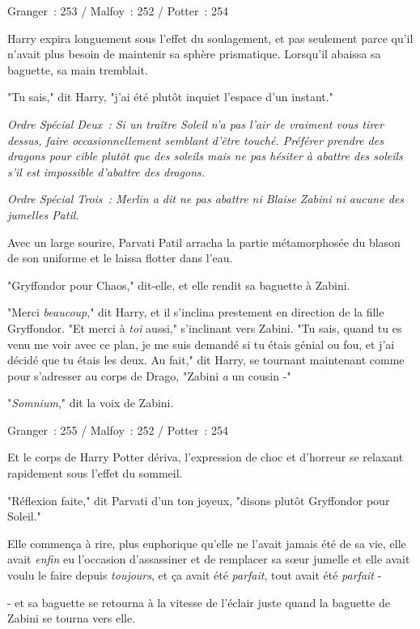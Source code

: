 Granger~: 253 / Malfoy~: 252 / Potter~: 254

Harry expira longuement sous l'effet du soulagement, et pas seulement parce qu'il n'avait plus besoin de maintenir sa sphère prismatique. Lorsqu'il abaissa sa baguette, sa main tremblait.

"Tu sais," dit Harry, "j'ai été plutôt inquiet l'espace d'un instant."

\emph{Ordre Spécial Deux~: Si un traître Soleil n'a pas l'air de vraiment vous tirer dessus, faire occasionnellement semblant d'être touché. Préférer prendre des dragons pour cible plutôt que des soleils mais ne pas hésiter à abattre des soleils s'il est impossible d'abattre des dragons.}

\emph{Ordre Spécial Trois~: Merlin a dit ne pas abattre ni Blaise Zabini ni aucune des jumelles Patil.}

Avec un large sourire, Parvati Patil arracha la partie métamorphosée du blason de son uniforme et le laissa flotter dans l'eau.

"Gryffondor pour Chaos," dit-elle, et elle rendit sa baguette à Zabini.

"Merci \emph{beaucoup}," dit Harry, et il s'inclina prestement en direction de la fille Gryffondor. "Et merci à \emph{toi} aussi," s'inclinant vers Zabini. "Tu sais, quand tu es venu me voir avec ce plan, je me suis demandé si tu étais génial ou fou, et j'ai décidé que tu étais les deux. Au fait," dit Harry, se tournant maintenant comme pour s'adresser au corps de Drago, "Zabini \emph{a} un cousin -"

"\emph{Somnium}," dit la voix de Zabini.

\later

Granger~: 255 / Malfoy~: 252 / Potter~: 254

Et le corps de Harry Potter dériva, l'expression de choc et d'horreur se relaxant rapidement sous l'effet du sommeil.

"Réflexion faite," dit Parvati d'un ton joyeux, "disons plutôt Gryffondor pour Soleil."

Elle commença à rire, plus euphorique qu'elle ne l'avait jamais été de sa vie, elle avait \emph{enfin} eu l'occasion d'assassiner et de remplacer sa sœur jumelle et elle avait voulu le faire depuis \emph{toujours}, et ça avait été \emph{parfait}, tout avait été \emph{parfait} -

- et sa baguette se retourna à la vitesse de l'éclair juste quand la baguette de Zabini se tourna vers elle.

